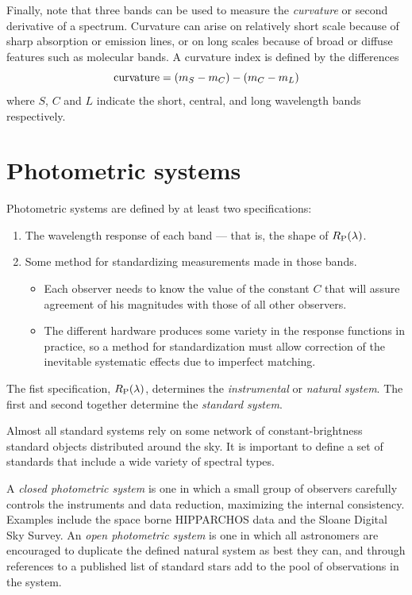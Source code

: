 Finally, note that three bands can be used to measure the {\it
  curvature} or second derivative of a spectrum. Curvature can arise
on relatively short scale because of sharp absorption or emission
lines, or on long scales because of broad or diffuse features such as
molecular bands. A curvature index is defined by the differences
\[
{\rm curvature}=(m_S-m_C)-(m_C-m_L)
\]
where $S$, $C$ and $L$ indicate the short, central, and long
wavelength bands respectively.

\section{Photometric systems}

Photometric systems are defined by at least two specifications:
\begin{enumerate}
\item The wavelength response of each band --- that is, the shape of
  $R_{\rm P}(\lambda)$.
\item Some method for standardizing measurements made in those bands. 
\begin{itemize}
\item Each observer needs to know the value of the constant $C$ that
  will assure agreement of his magnitudes with those of all other
  observers.
\item The different hardware produces some variety in the response
  functions in practice, so a method for standardization must allow
  correction of the inevitable systematic effects due to imperfect matching.
\end{itemize}
\end{enumerate}

The fist specification, $R_{\rm P}(\lambda)$, determines the
{\it instrumental} or {\it natural system}. The first and second
together determine the {\it standard system}. 

Almost all standard systems rely on some network of
constant-brightness standard objects distributed around the sky. It is
important to define a set of standards that include a wide variety of
spectral types.

A {\it closed photometric system} is one in which a small group of
observers carefully controls the instruments and data reduction,
maximizing the internal consistency. Examples include the space borne
HIPPARCHOS data and the Sloane Digital Sky Survey. An {\it open
  photometric system}  is one in which all astronomers are encouraged
to duplicate the defined natural system as best they can, and through
references to a published list of standard stars add to the pool of
observations in the system.

